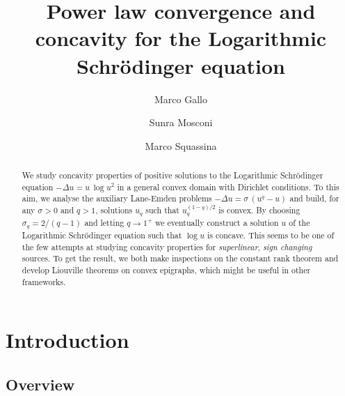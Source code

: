 \documentclass[12pt]{amsart}
\title[Power law convergence and Logarithmic Schrödinger equation]{Power law convergence and concavity for the Logarithmic Schrödinger equation}
\author[M.\ Gallo]{Marco Gallo \orcidlink{0000-0002-3141-9598}}
\author[S. \ Mosconi]{Sunra Mosconi \orcidlink{0000-0003-2432-7799}}
\author[M.\ Squassina]{Marco Squassina \orcidlink{0000-0003-0858-4648}}
\numberwithin{equation}{section}
\theoremstyle{plain}
\theoremstyle{plain}
\theoremstyle{plain}
\theoremstyle{definition}
\begin{document}
\begin{abstract}
We study concavity properties of positive solutions to the Logarithmic Schrödinger equation $-\Delta u=u\, \log u^2$ in a general convex domain with Dirichlet conditions. 
To this aim, we analyse the auxiliary Lane-Emden problems $-\Delta u = \sigma\, (u^q-u)$ and build, for any $\sigma>0$ and $q>1$, solutions $u_q$ such that $u_q^{(1-q)/2}$ is convex. 
By choosing $\sigma_q=2/(q-1)$ and letting $q \to 1^+$ we eventually construct a solution $u$ of the Logarithmic Schrödinger equation such that $\log u$ is concave. 
This seems to be one of the few attempts at studying concavity properties for \emph{superlinear}, \emph{sign changing} sources. 
To get the result, we both make inspections on the constant rank theorem and develop Liouville theorems on convex epigraphs, which might be useful in other frameworks.
\end{abstract}

\maketitle

\begin{center}
\vspace{-1.5em}
\begin{minipage}{12cm}
\tableofcontents
\end{minipage}
\end{center}
	


\section{Introduction}\label{sec1}


 \subsection{Overview}
 
\end{document}
